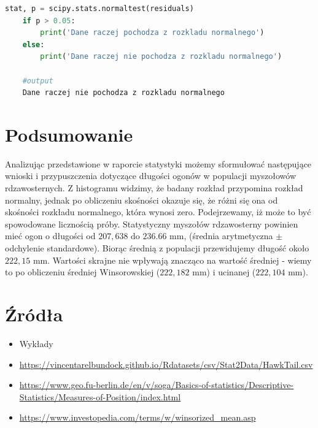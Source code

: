 \documentclass{article}
\theoremstyle{break}
\begin{document}
\begin{lstlisting}[language=Python, caption=Test Levene'a, label={norm}]
	stat, p = scipy.stats.normaltest(residuals)
	if p > 0.05:
		print('Dane raczej pochodza z rozkladu normalnego')
	else:
		print('Dane raczej nie pochodza z rozkladu normalnego')
		
	#output
	Dane raczej nie pochodza z rozkladu normalnego
\end{lstlisting}

	
\section{Podsumowanie}
	Analizując przedstawione w raporcie statystyki możemy sformułować następujące wnioski i przypuszczenia dotyczące długości ogonów w populacji myszołowów rdzawosternych. Z histogramu widzimy, że badany rozkład przypomina rozkład normalny, jednak po obliczeniu skośności okazuje się, że różni się ona od skośności rozkładu normalnego, która wynosi zero. Podejrzewamy, iż może to być spowodowane licznością próby. Statystyczny myszołów rdzawosterny powinien mieć ogon o długości od $207,638$ do $236.66$ mm, (średnia arytmetyczna $\pm$ odchylenie standardowe). Biorąc średnią z populacji przewidujemy długość około $222,15$ mm. Wartości skrajne nie wpływają znacząco na wartość średniej - wiemy to po obliczeniu średniej Winsorowskiej ($222,182$ mm) i ucinanej ($222,104$ mm). 
	
	\section{Źródła}
	\begin{itemize}
		\item Wykłady
		\item \url{https://vincentarelbundock.github.io/Rdatasets/csv/Stat2Data/HawkTail.csv}
		\item \url{https://www.geo.fu-berlin.de/en/v/soga/Basics-of-statistics/Descriptive-Statistics/Measures-of-Position/index.html}
		\item \url{https://www.investopedia.com/terms/w/winsorized_mean.asp}
	\end{itemize}
	
	
\end{document}
